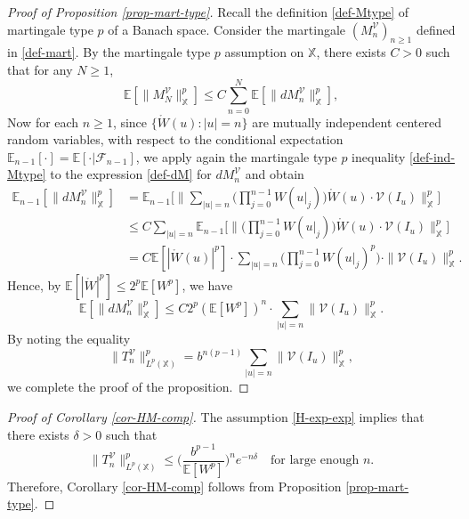 \documentclass[12pt]{amsart}
\theoremstyle{definition}
\theoremstyle{remark}
\newcommand{\N}{\mathbb{N}}
\newcommand{\E}{\mathbb{E}}
\newcommand{\fX}{\mathbb{X}}
\newcommand{\Ab}{\mathcal{A}}
\numberwithin{equation}{section}
\begin{document}
\begin{proof}[Proof of Proposition \ref{prop-mart-type}]
Recall the definition \eqref{def-Mtype} of martingale type $p$ of a Banach space.   Consider the martingale $(M_n^\mathcal{V})_{n\ge 1}$  defined in   \eqref{def-mart}.
By the martingale type $p$ assumption on $\fX$, there exists $C>0$ such that for any $N\ge 1$, 
\[
\E[\|M_N^\mathcal{V} \|_{\fX}^p] \le C   \sum_{n=0}^N \E[\|dM_n^\mathcal{V} \|_{\fX}^p],
\]
Now for each $n\ge 1$, since $\{\mathring{W}(u): |u|=n\}$ are mutually independent centered random variables, with respect to the conditional expectation $\E_{n-1}[\cdot] = \E[\cdot|\mathscr{F}_{n-1}]$,   we  apply again the martingale type $p$ inequality \eqref{def-ind-Mtype}  to the expression \eqref{def-dM} for $dM_n^\mathcal{V}$  and obtain 
\begin{align*}
\E_{n-1}[ \|dM_n^\mathcal{V}\|_{\fX}^p]  & =    \E_{n-1}\Big[   \Big\|  \sum_{|u|=n}  \Big(\prod_{j=0}^{n-1} W(u|_j)\Big) \mathring{W}(u) \cdot \mathcal{V}(I_u)   \Big\|_{\fX}^p \Big]  
\\
&  \le C    \sum_{|u|=n}    \E_{n-1}\Big[ \Big\| \Big(\prod_{j=0}^{n-1} W(u|_j)\Big) \mathring{W}(u) \cdot \mathcal{V}(I_u)   \Big\|_{\fX}^p\Big]
\\
& = C   \E[|\mathring{W}(u)|^p]    \cdot    \sum_{|u|=n}     \Big(\prod_{j=0}^{n-1} W(u|_j)^p \Big)  \cdot     \| \mathcal{V}(I_u)   \|_{\fX}^p. 
\end{align*}
Hence, by $\E[|\mathring{W}|^p] \le 2^p  \E[W^p]$, we have 
\[
\E[ \|dM_n^\mathcal{V}\|_{\fX}^p]  \le   C  2^p (\E[W^p])^{n}  \cdot    \sum_{|u|=n}       \| \mathcal{V}(I_u)   \|_{\fX}^p.  
\]
By noting the equality
\[
\|T_n^\mathcal{V}\|_{L^p(\fX)}^p = b^{n(p-1)} \sum_{|u|=n}  \| \mathcal{V}(I_u)\|_{\fX}^p, 
\]
we complete the proof of the proposition. 
\end{proof}


\begin{proof}[Proof of Corollary \ref{cor-HM-comp}]
The assumption \eqref{H-exp-exp} implies that there exists $\delta>0$ such that 
\[
 \|T_n^\mathcal{V}\|_{L^p(\fX)}^p  \le       \Big(  \frac{b^{p-1}}{\E[W^p]}  \Big)^n    e^{-n \delta} \quad  \text{for large enough $n$}. 
\]
Therefore,  Corollary \ref{cor-HM-comp} follows from Proposition \ref{prop-mart-type}.
\end{proof}

\end{document}
